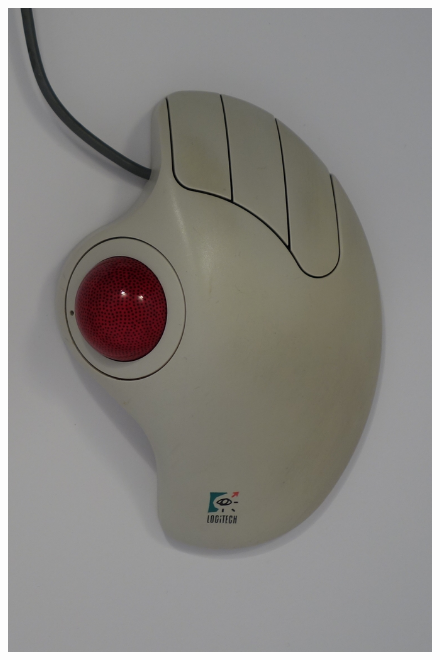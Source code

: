 \documentclass[11pt, a4paper]{article}
\begin{document}
\begin{figure}[h]
    \centering
    \includegraphics[scale=1]{1995_logitech_trackman/2.16.JPG}

\end{figure}
\end{document}
